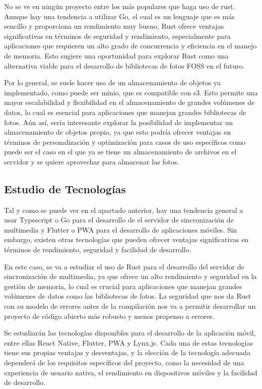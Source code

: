 No se ve en ningún proyecto entre los más populares que haga uso de \gls{rust}. Aunque hay una tendencia a utilizar Go, el cual es un lenguaje que es más sencillo y proporciona un rendimiento muy bueno, Rust ofrece ventajas significativas en términos de seguridad y rendimiento, especialmente para aplicaciones que requieren un alto grado de concurrencia y eficiencia en el manejo de memoria. Esto sugiere una oportunidad para explorar Rust como una alternativa viable para el desarrollo de bibliotecas de fotos FOSS en el futuro.

Por lo general, se suele hacer uso de un almacenamiento de objetos ya implementado, como puede ser \gls{minio}, que es compatible con \gls{s3}. Esto permite una mayor escalabilidad y flexibilidad en el almacenamiento de grandes volúmenes de datos, lo cual es esencial para aplicaciones que manejan grandes bibliotecas de fotos.
Aún así, sería interesante explorar la posibilidad de implementar un almacenamiento de objetos propio, ya que esto podría ofrecer ventajas en términos de personalización y optimización para casos de uso específicos como puede ser el caso en el que ya se tiene un almacenamiento de archivos en el servidor y se quiere aprovechar para almacenar las fotos.

\subsection{Estudio de Tecnologías}

Tal y como se puede ver en el apartado anterior, hay una tendencia general a usar Typescript o Go para el desarrollo de el servidor de sincronización de multimedia y Flutter o PWA para el desarrollo de aplicaciones móviles. Sin embargo, existen otras tecnologías que pueden ofrecer ventajas significativas en términos de rendimiento, seguridad y facilidad de desarrollo.

En este caso, se va a estudiar el uso de Rust para el desarrollo del servidor de sincronización de multimedia, ya que ofrece un alto rendimiento y seguridad en la gestión de memoria, lo cual es crucial para aplicaciones que manejan grandes volúmenes de datos como las bibliotecas de fotos.
La seguridad que nos da Rust con su modelo de errores antes de la compilación nos va a permitir desarrollar un proyecto de código abierto más robusto y menos propenso a errores.

Se estudiarán las tecnologías disponibles para el desarrollo de la aplicación móvil, entre ellas React Native, Flutter, PWA y Lynx.js. Cada una de estas tecnologías tiene sus propias ventajas y desventajas, y la elección de la tecnología adecuada dependerá de los requisitos específicos del proyecto, como la necesidad de una experiencia de usuario nativa, el rendimiento en dispositivos móviles y la facilidad de desarrollo.

